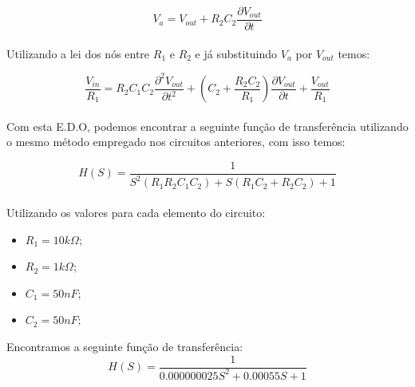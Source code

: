 \documentclass[a4paper, 12pt]{article}
\begin{document}
			\[
			V_{a} = V_{out} + R_{2}C_{2}\frac{\partial V_{out}}{\partial t}
			\] 	\\

			Utilizando a lei dos nós entre $R_{1}$ e $R_{2}$ e já substituindo $V_{a}$ por $V_{out}$ temos:

			\[
			\frac{V_{in}}{R_{1}} = R_{2}C_{1}C_{2}\frac{\partial^{2} V_{out}}{\partial t^{2}} + \left(C_{2} + \frac{R_{2}C_{2}}{R_{1}}\right)\frac{\partial V_{out}}{\partial t} +  \frac{V_{out}}{R_{1}}
			\] 	\\

			Com esta E.D.O, podemos encontrar a seguinte função de transferência utilizando o mesmo método empregado nos circuitos anteriores, com isso temos:

			\[
			H(S) = \frac{1}{S^{2}\left(R_{1}R_{2}C_{1}C_{2}\right) + S\left(R_{1}C_{2} + R_{2}C_{2}\right) + 1}
			\] 	\\

			Utilizando os valores para cada elemento do circuito:
			\begin{itemize}
				\item $R_{1} = 10k\Omega;$
				\item $R_{2} = 1k\Omega;$
				\item $C_{1} = 50nF;$
				\item $C_{2} = 50nF;$
			\end{itemize}

			Encontramos a seguinte função de transferência:
			\[
			H(S) = \frac{1}{0.000000025S^{2} + 0.00055S + 1}
			\] 	\\
\end{document}
